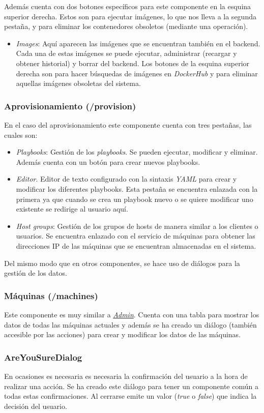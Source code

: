 \bigskip
Además cuenta con dos botones específicos para este componente en la esquina superior derecha. Estos son para ejecutar imágenes, lo que nos lleva a la segunda pestaña, y para eliminar los contenedores obsoletos (mediante una operación).
\begin{itemize}
	\item \textit{Images}: Aquí aparecen las imágenes que se encuentran también en el backend. Cada una de estas imágenes se puede ejecutar, administrar (recargar y obtener historial) y borrar del backend. Los botones de la esquina superior derecha son para hacer búsquedas de imágenes en \textit{DockerHub} y para eliminar aquellas imágenes obsoletas del sistema.
\end{itemize}




\subsubsection{Aprovisionamiento (/provision)}


En el caso del aprovisionamiento este componente cuenta con tres pestañas, las cuales son:
\begin{itemize}
	\item \textit{Playbooks}: Gestión de los \textit{playbooks}. Se pueden ejecutar, modificar y eliminar. Además cuenta con un botón para crear nuevos playbooks.
	\item \textit{Editor}. Editor de texto configurado con la sintaxis \textit{YAML} para crear y modificar los diferentes playbooks. Esta pestaña se encuentra enlazada con la primera ya que cuando se crea un playbook nuevo o se quiere modificar uno existente se redirige al usuario aquí.
	\item \textit{Host groups}: Gestión de los grupos de hosts de manera similar a los clientes o usuarios. Se encuentra enlazado con el servicio de máquinas para obtener las direcciones IP de las máquinas que se encuentran almacenadas en el sistema.
\end{itemize}

Del mismo modo que en otros componentes, se hace uso de diálogos para la gestión de los datos.


\subsubsection{Máquinas (/machines)}

Este componente es muy similar a \hyperref[sec:admin]{\textit{Admin}}. Cuenta con una tabla para mostrar los datos de todas las máquinas actuales y además se ha creado un diálogo (también accesible por las acciones) para crear y modificar los datos de las máquinas.


\subsubsection{AreYouSureDialog}


En ocasiones es necesaria es necesaria la confirmación del usuario a la hora de realizar una acción. Se ha creado este  diálogo para tener un componente común a todas estas confirmaciones. Al cerrarse emite un valor (\textit{true} o \textit{false}) que indica la decisión del usuario.


